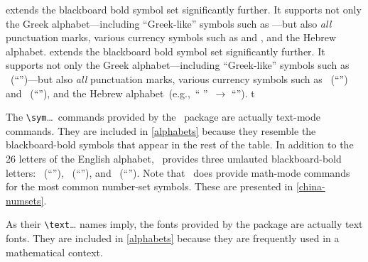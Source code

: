 \begin{center}
\begin{tablenote}[\dag]
  \ifx\MBBmathbb\undefined
     extends the blackboard bold symbol set
    significantly further.  It supports not only the
    Greek
    alphabet---including ``Greek-like'' symbols such as
    \cmd{\bbnabla}---but also \emph{all} punctuation marks, various
    currency
    symbols such as \cmd{\bbdollar} and \cmd{\bbeuro}, and the
    Hebrew alphabet.
  \else
     extends the blackboard bold symbol set
    significantly further.  It supports not only the
    Greek
    alphabet---including ``Greek-like'' symbols such as
    \cmdI{\bbnabla}~(``\bbnabla'')---but also \emph{all} punctuation
    marks, various
    currency
    symbols such as \cmdI{\bbdollar}~(``\bbdollar'') and
    \cmdI{\bbeuro}~(``\bbeuro''),
    and the Hebrew
    alphabet~(e.g.,~``\cmdI{\bbfinalnun}\linebreak[1]\cmdI{\bbyod}%
    \linebreak[1]\cmdI{\bbqof}\linebreak[1]\cmdI{\bbpe}''~$\rightarrow$
    ``\bbfinalnun\bbyod\bbqof\bbpe'').
  \fi    t
\end{tablenote}
\fi

\ifx\symA\undefined\else
\bigskip
\begin{tablenote}[\ddag]
  The \verb|\sym|\dots\ commands provided by the \CHINA\ package are
  actually text-mode commands.  They are included in \ref{alphabets}
  because they resemble the blackboard-bold symbols that appear in the
  rest of the table.  In addition to the 26 letters of the English
  alphabet, \CHINA\ provides three umlauted%
  blackboard-bold letters:
  \cmdI{\symAE}~(``\symAE''), \cmdI{\symOE}~(``\symOE''), and
  \cmdI{\symUE}~(``\symUE'').  Note that \CHINA\ does provide
  math-mode commands for the most common number-set symbols.  These
  are presented in \vref{china-numsets}.
\end{tablenote}
\fi

\ifx\textfrak\undefined\else
\bigskip
\begin{tablenote}[\P]
  As their \verb|\text|\dots{} names imply, the fonts provided by the
   package are actually text fonts.  They are
  included in \ref{alphabets} because they are frequently used
  in a mathematical context.
\end{tablenote}
\fi


\end{center}
